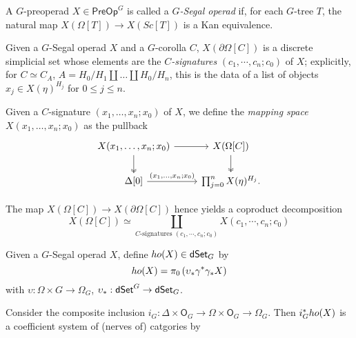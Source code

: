 \documentclass[a4paper,10pt
,draft
]{article}%
\renewcommand{\1}{\eta}%
\begin{document}
\begin{definition}
	A $G$-preoperad $X \in \mathsf{PreOp}^G$ is called a \textit{$G$-Segal operad} if, 
	for each $G$-tree $T$,
	the natural map 
	$X\left( \Omega[T] \right) \to 
	X \left( Sc[T] \right)$
	is a Kan equivalence.
\end{definition}

\begin{definition}%
      Given a $G$-Segal operad $X$ and a $G$-corolla $C$,
      $X(\partial \Omega[C])$ is a discrete simplicial set whose elements
      are the \textit{$C$-signatures} $(c_1,\cdots,c_n;c_0)$ of $X$;
      explicitly, for $C \simeq C_A$, $A = H_0/H_1 \amalg \dots \amalg H_0/H_n$, this is the data of
      a list of objects $x_j \in X(\eta)^{H_j}$ for $0 \leq j \leq n$.

      Given a $C$-signature $(x_1, \dots, x_n; x_0)$ of $X$, we define the \textit{mapping space} $X(x_1,\dots,x_n; x_0)$ as the pullback
      \[
            \begin{tikzcd}
                  X(x_1, \dots, x_n; x_0) \arrow[r] \arrow[d, twoheadrightarrow]
                  &
                  X(\Omega[C]) \arrow[d, twoheadrightarrow]
                  \\
                  \Delta[0] \arrow[r, "{(x_1, \dots, x_n;x_0)}"]
                  &
                  \prod_{j = 0}^n X(\eta)^{H_j}.
            \end{tikzcd}
      \]

      The map $X(\Omega[C]) \to X(\partial \Omega[C])$ hence yields
      a coproduct decomposition 
      \[
            X(\Omega[C]) \simeq \coprod_{C\text{-signatures }(c_1,\cdots,c_n;c_0)}
            X(c_1,\cdots,c_n;c_0)
      \]    
\end{definition}

\begin{definition}
      Given a $G$-Segal operad $X$, define $ho(X) \in \mathsf{dSet}_G$ by
      \[
            ho(X) = \pi_0\left(\upsilon_{\**}\gamma^{\**}\gamma_{\**}X\right)
      \]
      with $\upsilon: \Omega \times G \to \Omega_G$, $\upsilon_{\**}: \dSet^G \to \dSet_G$.

      Consider the composite inclusion $i_G: \Delta \times \mathsf O_G \to \Omega \times \mathsf O_G \to \Omega_G$.
      Then $i_G^{\**}ho(X)$ is a coefficient system of (nerves of) catgories by \cite[Prop. 5.9, Remark 5.11]{BP_edss}
\end{definition}
\end{document}
